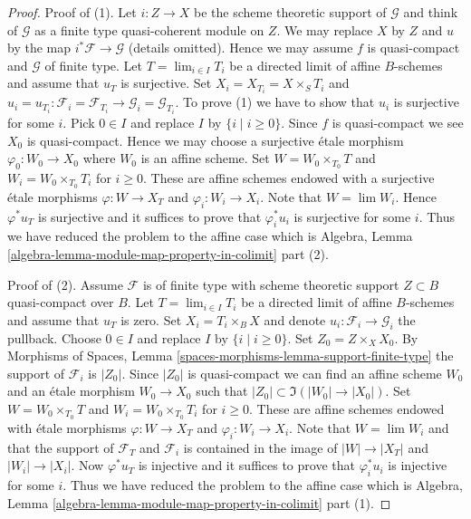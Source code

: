 \begin{proof}
Proof of (1). Let $i : Z \to X$ be the scheme theoretic support of
$\mathcal{G}$ and think of $\mathcal{G}$ as a finite type quasi-coherent
module on $Z$. We may replace $X$ by $Z$ and $u$ by the map
$i^*\mathcal{F} \to \mathcal{G}$ (details omitted). Hence we may assume
$f$ is quasi-compact and $\mathcal{G}$ of finite type.
Let $T = \lim_{i \in I} T_i$ be a directed limit of affine $B$-schemes
and assume that $u_T$ is surjective.
Set $X_i = X_{T_i} = X \times_S T_i$ and
$u_i = u_{T_i} : \mathcal{F}_i = \mathcal{F}_{T_i}
\to \mathcal{G}_i = \mathcal{G}_{T_i}$.
To prove (1) we have to show that $u_i$ is surjective for some $i$.
Pick $0 \in I$ and replace $I$ by $\{i \mid i \geq 0\}$.
Since $f$ is quasi-compact we see $X_0$ is quasi-compact.
Hence we may choose a surjective \'etale morphism $\varphi_0 : W_0 \to X_0$
where $W_0$ is an affine scheme. Set $W = W_0 \times_{T_0} T$
and $W_i = W_0 \times_{T_0} T_i$ for $i \geq 0$.  These
are affine schemes endowed
with a surjective \'etale morphisms $\varphi : W \to X_T$ and
$\varphi_i : W_i \to X_i$. Note that $W = \lim W_i$.
Hence $\varphi^*u_T$ is surjective and it suffices to prove that
$\varphi_i^*u_i$ is surjective for some $i$. Thus we have reduced
the problem to the affine case which is
Algebra, Lemma \ref{algebra-lemma-module-map-property-in-colimit} part (2).

\medskip\noindent
Proof of (2). Assume $\mathcal{F}$ is of finite type with scheme theoretic
support $Z \subset B$ quasi-compact over $B$. Let $T = \lim_{i \in I} T_i$
be a directed limit of affine $B$-schemes and assume that $u_T$ is zero.
Set $X_i = T_i \times_B X$ and denote $u_i : \mathcal{F}_i \to \mathcal{G}_i$
the pullback. Choose $0 \in I$ and replace $I$ by
$\{i \mid i \geq 0\}$. Set $Z_0 = Z \times_X X_0$. By
Morphisms of Spaces, Lemma \ref{spaces-morphisms-lemma-support-finite-type}
the support of $\mathcal{F}_i$ is $|Z_0|$. Since $|Z_0|$ is quasi-compact
we can find an affine scheme $W_0$ and an \'etale morphism $W_0 \to X_0$
such that $|Z_0| \subset \Im(|W_0| \to |X_0|)$.
Set $W = W_0 \times_{T_0} T$ and $W_i = W_0 \times_{T_0} T_i$ for $i \geq 0$.
These are affine schemes endowed
with \'etale morphisms $\varphi : W \to X_T$ and
$\varphi_i : W_i \to X_i$. Note that $W = \lim W_i$
and that the support of $\mathcal{F}_T$ and $\mathcal{F}_i$
is contained in the image of $|W| \to |X_T|$ and $|W_i| \to |X_i|$.
Now $\varphi^*u_T$ is injective and it suffices to prove that
$\varphi_i^*u_i$ is injective for some $i$.
Thus we have reduced the problem to the affine case which is
Algebra, Lemma \ref{algebra-lemma-module-map-property-in-colimit} part (1).


\end{proof}
